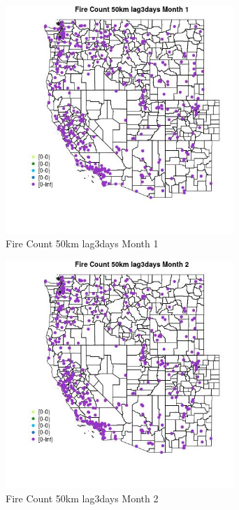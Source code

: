 \begin{figure} 
\centering  
\includegraphics[width=0.77\textwidth]{Code_Outputs/Report_ML_input_PM25_Step4_part_e_de_duplicated_aves_compiled_2019-05-18wNAs_MapObsMo1Fire_Count_50km_lag3days.jpg} 
\caption{\label{fig:Report_ML_input_PM25_Step4_part_e_de_duplicated_aves_compiled_2019-05-18wNAsMapObsMo1Fire_Count_50km_lag3days}Fire Count 50km lag3days Month 1} 
\end{figure} 
 

\begin{figure} 
\centering  
\includegraphics[width=0.77\textwidth]{Code_Outputs/Report_ML_input_PM25_Step4_part_e_de_duplicated_aves_compiled_2019-05-18wNAs_MapObsMo2Fire_Count_50km_lag3days.jpg} 
\caption{\label{fig:Report_ML_input_PM25_Step4_part_e_de_duplicated_aves_compiled_2019-05-18wNAsMapObsMo2Fire_Count_50km_lag3days}Fire Count 50km lag3days Month 2} 
\end{figure} 
 

